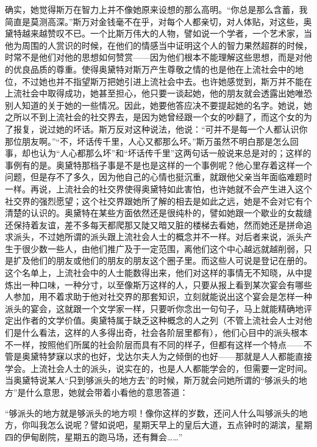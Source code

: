 \par 确实，她觉得斯万在智力上并不像她原来设想的那么高明。“你总是那么含蓄，我简直是莫测高深。”斯万对金钱毫不在乎，对每个人都亲切，对人体贴，对这些，奥黛特越来越赞叹不已。一个比斯万伟大的人物，譬如说一个学者，一个艺术家，当他为周围的人赏识的时候，在他们的情感当中证明这个人的智力果然超群的时候，时常不是他们对他的思想如何赞赏——因为他们根本不能理解这些思想，而是对他的优良品质的尊重。使得奥黛特对斯万产生尊敬之情的也是他在上流社会中的地位，不过她也并不指望斯万把她引进上流社会中去。也许她感觉到，斯万并不能在上流社会中取得成功，她甚至担心，他只要一谈起她，他的朋友就会透露出她唯恐别人知道的关于她的一些情况。因此，她要他答应决不要提起她的名字。她说，她之所以不到上流社会的社交界去，是因为她曾经跟一个女的吵翻了，而这个女的为了报复，说过她的坏话。斯万反对这种说法，他说：“可并不是每一个人都认识你那位朋友啊。”“不，坏话传千里，人心又都那么坏。”斯万虽然不明白那是怎么回事，却也认为“人心都那么坏”和“坏话传千里”这两句话一般说来总是对的；这样的事例有的是。奥黛特那档子事是不是也是这样的一个事例呢？他心里存着这样一个问题，但是存不了多久，因为他自己的心情也挺沉重，就跟他父亲当年面临难题时一样。再说，上流社会的社交界使得奥黛特如此害怕，也许她就不会产生进入这个社交界的强烈愿望；这个社交界跟她所了解的相去是如此之远，她是不会对它有个清楚的认识的。奥黛特在某些方面依然还是很纯朴的，譬如她跟一个歇业的女裁缝还保持着友谊，差不多每天都爬那又陡又暗又脏的楼梯去看她，然而她还是拼命追求派头，不过她所谓的派头跟上流社会人士的概念并不一样。对后者来说，派头产生于很少数一些人，由他们推广及于一定范围，离他们这个中心越远就越削弱，只是扩及他们的朋友或他们的朋友的朋友这个圈子里。而这些人可说是登记在册的。这个名单上，上流社会中的人士能数得出来，他们对这样的事情无不知晓，从中提炼出一种口味，一种分寸，以至像斯万这样的人，只要从报上看到某次宴会有哪些人参加，用不着求助于他对社交界的那套知识，立刻就能说出这个宴会是怎样一种派头的宴会，这就跟一个文学家一样，只要听你念出一句句子，马上就能精确地评定出作者的文学价值。奥黛特属于缺乏这种概念的人之列（不管上流社会人士对他们是什么看法，这样的人多得出奇，社会各阶层里都有），他们心目中的派头根本不一样，按照他们所属的社会阶层而具有不同的样子，但都有这样一个特点——不管是奥黛特梦寐以求的也好，戈达尔夫人为之倾倒的也好——那就是人人都能直接学会。上流社会人士的派头，说实在的，也是人人都能学会的，但需要一定时间。当奥黛特说某人“只到够派头的地方去”的时候，斯万就会问她所谓的“够派头的地方”是什么意思，她就会带着小看他的意思答道：
\par “够派头的地方就是够派头的地方呗！像你这样的岁数，还问人什么叫够派头的地方，你叫我怎么说呢？譬如说吧，星期天早上的皇后大道，五点钟时的湖滨，星期四的伊甸剧院，星期五的跑马场，还有舞会……”
